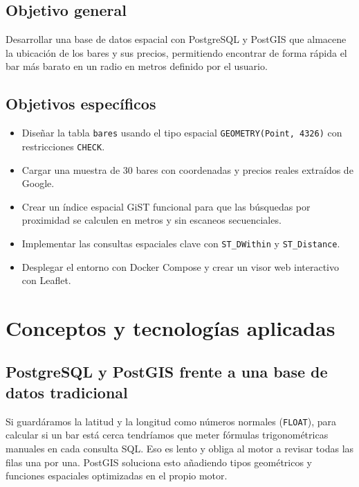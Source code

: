 \documentclass[a4paper,12pt]{article}
\begin{document}
\subsection{Objetivo general}
Desarrollar una base de datos espacial con PostgreSQL y PostGIS que almacene la ubicación de los bares y sus precios, permitiendo encontrar de forma rápida el bar más barato en un radio en metros definido por el usuario.

\subsection{Objetivos específicos}
\begin{itemize}[leftmargin=1.0cm]
  \item Diseñar la tabla \texttt{bares} usando el tipo espacial \texttt{GEOMETRY(Point, 4326)} con restricciones \texttt{CHECK}.
  \item Cargar una muestra de 30 bares con coordenadas y precios reales extraídos de Google.
  \item Crear un índice espacial GiST funcional para que las búsquedas por proximidad se calculen en metros y sin escaneos secuenciales.
  \item Implementar las consultas espaciales clave con \texttt{ST\_DWithin} y \texttt{ST\_Distance}.
  \item Desplegar el entorno con Docker Compose y crear un visor web interactivo con Leaflet.
\end{itemize}

\section{Conceptos y tecnologías aplicadas}

\subsection{PostgreSQL y PostGIS frente a una base de datos tradicional}
Si guardáramos la latitud y la longitud como números normales (\texttt{FLOAT}), para calcular si un bar está cerca tendríamos que meter fórmulas trigonométricas manuales en cada consulta SQL. Eso es lento y obliga al motor a revisar todas las filas una por una. PostGIS soluciona esto añadiendo tipos geométricos y funciones espaciales optimizadas en el propio motor.
\end{document}
